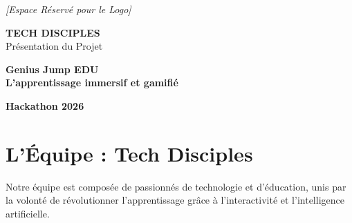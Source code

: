 \documentclass[12pt,a4paper]{article}
\begin{document}
\begin{titlepage}
    \centering
    \vspace*{2cm}
    
    \begin{tcolorbox}[colback=white, colframe=techorange, width=0.5\textwidth, arc=8pt, boxrule=2pt, center]
        \centering
        \vspace{1.5cm}
        \textcolor{techdark}{\textit{[Espace Réservé pour le Logo]}}
        \vspace{1.5cm}
    \end{tcolorbox}
    
    \vspace{2cm}
    {\Huge \color{techpurple} \textbf{TECH DISCIPLES}} \\[0.5cm]
    {\LARGE \color{techdark} Présentation du Projet} \\[1.5cm]
    
    \begin{tcolorbox}[colback=techpurple, colframe=techpurple, width=0.8\textwidth, center, arc=4pt, boxrule=0pt]
        \centering
        {\Huge \color{white} \textbf{Genius Jump EDU}} \\[0.3cm]
        {\large \color{techorange} \textbf{L'apprentissage immersif et gamifié}}
    \end{tcolorbox}
    
    \vfill
    {\large \color{techdark} \textbf{Hackathon 2026}}
    \vspace*{2cm}
\end{titlepage}

\newpage

\section*{L'Équipe : Tech Disciples}
Notre équipe est composée de passionnés de technologie et d'éducation, unis par la volonté de révolutionner l'apprentissage grâce à l'interactivité et l'intelligence artificielle.
\end{document}
